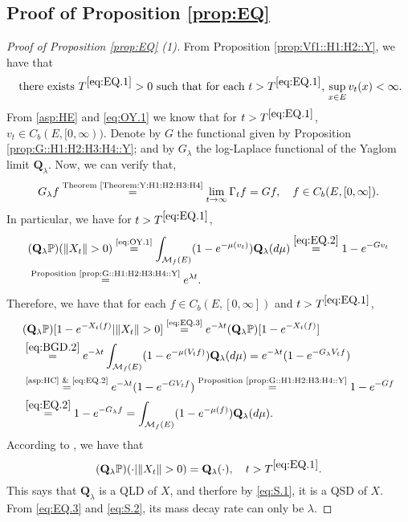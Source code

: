 \documentclass[12pt,a4paper]{amsart}
\numberwithin{equation}{section}
\theoremstyle{plain}
\theoremstyle{definition}
\theoremstyle{remark}
\begin{document}
\subsection{Proof of Proposition \ref{prop:EQ}} \label{sec:EQ}
\begin{proof}[Proof of Proposition \ref{prop:EQ} (1)]
	From Proposition \ref{prop:Vf1::H1:H2::Y}, we have that 
	\begin{equation} \label{eq:EQ.1}
	\text{ there exists $T^{\eqref{eq:EQ.1}}>0$ such that for each $t>T^{\eqref{eq:EQ.1}}$, $\sup_{x\in E}v_t(x) < \infty$.}
	\end{equation}	
	From \eqref{asp:HE} and \eqref{eq:OY.1} we know that for $t > T^{\eqref{eq:EQ.1}}$, $v_t \in C_b(E,[0,\infty))$.  
	Denote by $G$ the functional given by Proposition \ref{prop:G::H1:H2:H3:H4::Y}; and by $G_\lambda$ the log-Laplace functional of the Yaglom limit $\mathbf Q_\lambda$. 
	Now, we can verify that,
	\begin{equation} \label{eq:EQ.2}
	G_\lambda f \overset{\text{Theorem \ref{Theorem:Y:H1:H2:H3:H4}}}= \lim_{t\to \infty} \Gamma_t f = Gf, \quad f\in C_b(E,[0,\infty]).
	\end{equation}
	In particular, we have for $t> T^{\eqref{eq:EQ.1}}$,
	\begin{align}
	&(\mathbf Q_\lambda \mathbb P) (\|X_t\|>0) 
	\overset{\text{\eqref{eq:OY.1}}}= \int_{\mathcal M_f(E)}(1-e^{-\mu(v_t)})\mathbf Q_\lambda (d\mu)
	\overset{\eqref{eq:EQ.2}}= 1 - e^{-G v_t}
	\\&\overset{\text{Proposition \ref{prop:G::H1:H2:H3:H4::Y}}}= e^{\lambda t}.  \label{eq:EQ.3}
	\end{align}
	Therefore, we have that for each $f\in C_b(E,[0,\infty])$ and $t > T^{\eqref{eq:EQ.1}}$,
	\begin{align}
	&(\mathbf Q_\lambda \mathbb P)[1 - e^{-X_t(f)} | \|X_t\| > 0] 
	\overset{\text{\eqref{eq:EQ.3}}}= e^{- \lambda t} (\mathbf Q_\lambda \mathbb P)[1- e^{-X_t(f)}] 
	\\& \overset{\eqref{eq:BGD.2}}= e^{- \lambda t} \int_{\mathcal M_f(E)} (1- e^{-\mu(V_tf)} ) \mathbf Q_\lambda (d\mu)
	= e^{-\lambda t} (1 - e^{- G_\lambda V_tf})
	\\& \overset{\text{\eqref{asp:HC} \& \eqref{eq:EQ.2}}}= e^{-\lambda t} (1 - e^{- G V_tf})
	\overset{\text{Proposition \ref{prop:G::H1:H2:H3:H4::Y}}}= 1 - e^{-Gf}
	\\&\overset{\eqref{eq:EQ.2}}= 1- e^{-G_\lambda f}
	=\int_{\mathcal M_f(E)} (1 - e^{-\mu(f)}) \mathbf Q_\lambda (d\mu).
	\end{align}
	According to \cite[Theorem 1.17]{Li2011MeasureValued}, we have that
	\[
	(\mathbf Q_\lambda \mathbb P)(\cdot |\|X_t\| > 0) = \mathbf Q_{\lambda}(\cdot), \quad t > T^{\eqref{eq:EQ.1}}.
	\]
	This says that $\mathbf Q_\lambda$ is a QLD of $X$, and therfore by \eqref{eq:S.1}, it is a QSD of $X$.
	From \eqref{eq:EQ.3} and \eqref{eq:S.2}, its mass decay rate can only be $\lambda$.
\end{proof}
\end{document}
